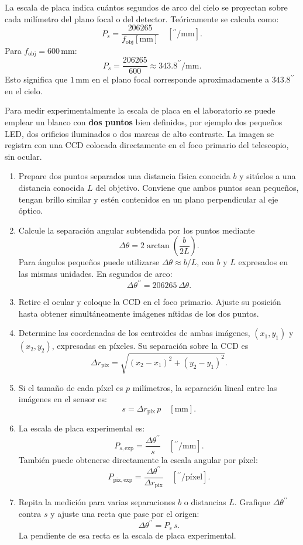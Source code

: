 La escala de placa indica cuántos segundos de arco del cielo se proyectan sobre cada milímetro del plano focal o del detector. Teóricamente se calcula como:
$$
P_s=\frac{206265}{f_{\mathrm{obj}}[\mathrm{mm}]}
\quad \left[{}^{\prime\prime}/\mathrm{mm}\right].
$$
Para $f_{\mathrm{obj}}=600\,\mathrm{mm}$:
$$
P_s=\frac{206265}{600}\approx 343.8^{\prime\prime}/\mathrm{mm}.
$$
Esto significa que $1\,\mathrm{mm}$ en el plano focal corresponde aproximadamente a $343.8^{\prime\prime}$ en el cielo.

Para medir experimentalmente la escala de placa en el laboratorio se puede emplear un blanco con \textbf{dos puntos} bien definidos, por ejemplo dos pequeños LED, dos orificios iluminados o dos marcas de alto contraste. La imagen se registra con una CCD colocada directamente en el foco primario del telescopio, sin ocular.

\begin{enumerate}
    \item Prepare dos puntos separados una distancia física conocida $b$ y sitúelos a una distancia conocida $L$ del objetivo. Conviene que ambos puntos sean pequeños, tengan brillo similar y estén contenidos en un plano perpendicular al eje óptico.
    \item Calcule la separación angular subtendida por los puntos mediante
$$
\Delta\theta=2\arctan\left(\frac{b}{2L}\right).
$$
Para ángulos pequeños puede utilizarse $\Delta\theta\approx b/L$, con $b$ y $L$ expresados en las mismas unidades. En segundos de arco:
$$
\Delta\theta^{\prime\prime}=206265\,\Delta\theta.
$$
    \item Retire el ocular y coloque la CCD en el foco primario. Ajuste su posición hasta obtener simultáneamente imágenes nítidas de los dos puntos.
    \item Determine las coordenadas de los centroides de ambas imágenes, $(x_1,y_1)$ y $(x_2,y_2)$, expresadas en píxeles. Su separación sobre la CCD es
$$
\Delta r_{\mathrm{pix}}
=\sqrt{(x_2-x_1)^2+(y_2-y_1)^2}.
$$
    \item Si el tamaño de cada píxel es $p$ milímetros, la separación lineal entre las imágenes en el sensor es:
$$
s=\Delta r_{\mathrm{pix}}\,p
\quad [\mathrm{mm}].
$$
    \item La escala de placa experimental es:
$$
P_{s,\mathrm{exp}}=\frac{\Delta\theta^{\prime\prime}}{s}
\quad \left[{}^{\prime\prime}/\mathrm{mm}\right].
$$
También puede obtenerse directamente la escala angular por píxel:
$$
P_{\mathrm{pix,exp}}
=\frac{\Delta\theta^{\prime\prime}}{\Delta r_{\mathrm{pix}}}
\quad \left[{}^{\prime\prime}/\text{píxel}\right].
$$
    \item Repita la medición para varias separaciones $b$ o distancias $L$. Grafique $\Delta\theta^{\prime\prime}$ contra $s$ y ajuste una recta que pase por el origen:
$$
\Delta\theta^{\prime\prime}=P_s\,s.
$$
La pendiente de esa recta es la escala de placa experimental.
\end{enumerate}

